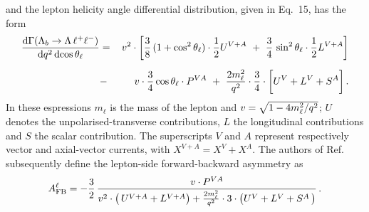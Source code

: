 and the lepton helicity angle differential distribution, given in Eq.~15, has the form
\begin{eqnarray}
\label{costheta2}
\frac{\mathrm{d}\Gamma(\Lambda_{b}\rightarrow \Lambda \,\ell^{+}\ell^{-})}{\mathrm{d}q^2\,\mathrm{d}\!\cos\theta_\ell} 
&=&\,
v^{2}\cdot\bigg[\frac{3}{8}\,(1+\cos^2\theta_\ell)\cdot
\frac{1}{2} U^{V+A}  
\ + \ \frac{3}{4}\,\sin^2\theta_\ell\cdot
\frac{1}{2} L^{V+A} \bigg]\label{distr2}\nonumber\\[2mm]
&-&\,v \cdot\frac{3}{4}\cos\theta_\ell\cdot P^{VA} 
\ + \ \frac{2m_{\ell}^{2}}{q^{2}}\cdot \frac{3}{4}\cdot
\bigg[ U^{V}+ L^{V} + S^{A} \bigg]\,.
\end{eqnarray}
%
In these espressions $m_\ell$ is the mass of the lepton and $v = \sqrt{1-4m_\ell^2/q^2}$; $U$ denotes
the unpolarised-transverse contributions, $L$ the longitudinal
contributions and $S$ the scalar contribution. The superscripts $V$ and $A$ represent respectively
vector and axial-vector currents, with $X^{V+A} = X^{V} + X^{A}$. The authors of Ref.~\cite{Gutsche:2013pp} 
subsequently define the lepton-side forward-backward asymmetry as
\begin{equation}
A_{\rm FB}^{\ell} 
= - \frac{3}{2}\,\frac{v\cdot P^{VA}}
{v^{2}\cdot\big(\,U^{V+A}
+L^{V+A}\big)+\frac{2m_{\ell}^{2}}{q^{2}}\cdot 3 \cdot
\big(U^{V}+L^{V}
+S^{A}\,\big) }\,.
\label{eq:afbDef}
\end{equation}
